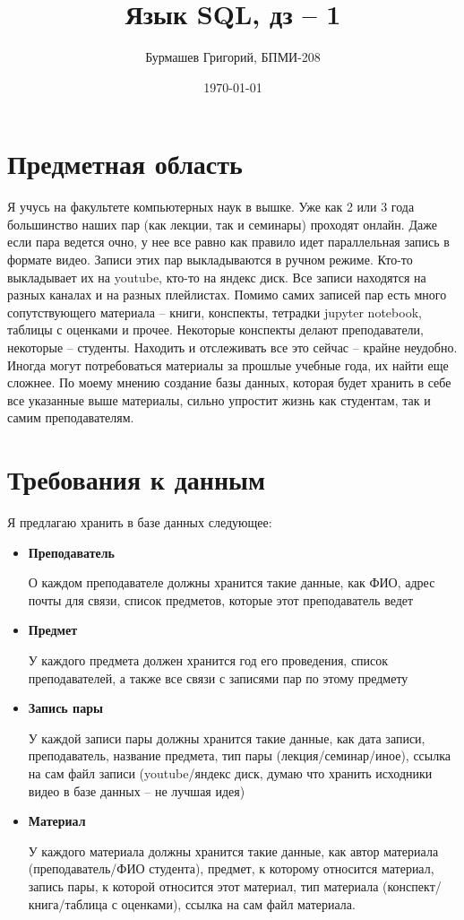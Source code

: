 \documentclass[a4paper,12pt]{article}
\author{Бурмашев Григорий, БПМИ-208}
\title{Язык SQL, дз -- 1}
\date{\today}
\begin{document}
\maketitle
\clearpage
\section*{Предметная область}
Я учусь на факультете компьютерных наук в вышке. Уже как 2 или 3 года большинство наших пар (как лекции, так и семинары) проходят онлайн. Даже если пара ведется очно, у нее все равно как правило идет параллельная запись в формате видео. Записи этих пар выкладываются в ручном режиме. Кто-то выкладывает их на youtube, кто-то на яндекс диск. Все записи находятся на разных каналах и на разных плейлистах. Помимо самих записей пар есть много сопутствующего материала -- книги, конспекты, тетрадки jupyter notebook, таблицы с оценками и прочее. Некоторые конспекты делают преподаватели, некоторые -- студенты. Находить и отслеживать все это сейчас -- крайне неудобно. Иногда могут потребоваться материалы за прошлые учебные года, их найти еще сложнее. По моему мнению создание базы данных, которая будет хранить в себе все указанные выше материалы, сильно упростит жизнь как студентам, так и самим преподавателям.
\section*{Требования к данным}
Я предлагаю хранить в базе данных следующее:
\begin{itemize}
\item \textbf{Преподаватель}

О каждом преподавателе должны хранится такие данные, как ФИО, адрес почты для связи, список предметов, которые этот преподаватель ведет

\item \textbf{Предмет}

У каждого предмета должен хранится год его проведения, список преподавателей, а также все связи с записями пар по этому предмету

\item \textbf{Запись пары}

У каждой записи пары должны хранится такие данные, как дата записи, преподаватель, название предмета, тип пары (лекция/семинар/иное), ссылка на сам файл записи (youtube/яндекс диск, думаю что хранить исходники видео в базе данных -- не лучшая идея)

\item \textbf{Материал}

У каждого материала должны хранится такие данные, как автор материала (преподаватель/ФИО студента), предмет, к которому относится материал, запись пары, к которой относится этот материал, тип материала (конспект/книга/таблица с оценками), ссылка на сам файл материала.
\end{itemize}
\end{document}

